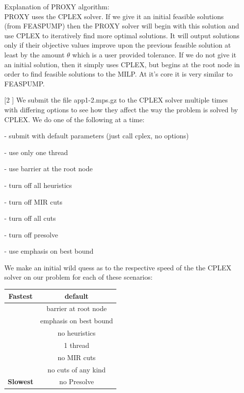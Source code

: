 \documentclass{article}
\begin{document}
\begin{itemize}
\vspace{.2in}

Explanation of PROXY algorithm:
\\ \newline
PROXY uses the CPLEX solver. If we give it an initial feasible solutions (from FEASPUMP) then the PROXY solver will begin with this solution and use CPLEX to iteratively find more optimal solutions. It will output solutions only if their objective values improve upon the previous feasible solution at least by the amount $\theta$ which is a user provided tolerance. If we do not give it an initial solution, then it simply uses CPLEX, but begins at the root node in order to find feasible solutions to the MILP. At it's core it is very similar to FEASPUMP.

\newpage


\item[[2]] We submit the file app1-2.mps.gz to the CPLEX solver multiple times with differing options to see how they affect the way the problem is solved by CPLEX. We do one of the following at a time:

  - submit with default parameters (just call cplex, no options)
  
   - use only one thread

   - use barrier at the root node

   - turn off all heuristics

   - turn off MIR cuts

   - turn off all cuts

   - turn off presolve

   - use emphasis on best bound

\vspace{.2in}

We make an initial wild quess as to the respective speed of the the CPLEX solver on our problem for each of these scenarios:
\vspace{.2in}
\begin{center}
\begin{tabular}{||c|c||}\hline
\textbf{Fastest}	&	default	\\	\hline
		&	barrier at root node	\\	\hline
		&	emphasis on best bound	\\	\hline
		&	no heuristics			\\	\hline
		&	1 thread	\\ \hline
		&	no MIR cuts	\\ \hline
		&	no cuts of any kind	\\ \hline
\textbf{Slowest}	&	no Presolve	\\ \hline
\end{tabular}
\end{center}


\end{itemize}
\end{document}
